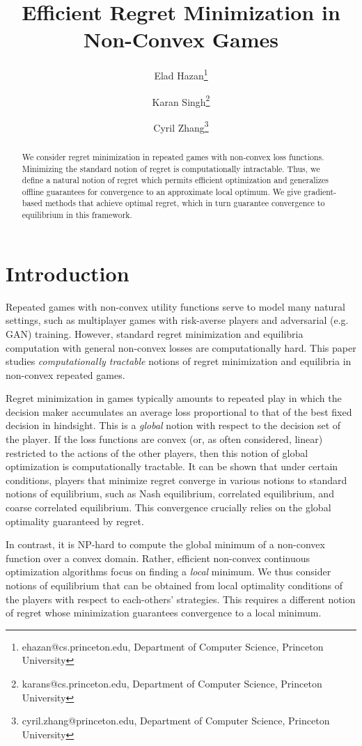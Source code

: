 \documentclass{article}
\title{Efficient Regret Minimization in Non-Convex Games}
\author{Elad Hazan\footnote{ehazan@cs.princeton.edu, Department of Computer Science, Princeton University} \and Karan Singh\footnote{karans@cs.princeton.edu, Department of Computer Science, Princeton University} \and Cyril Zhang\footnote{cyril.zhang@princeton.edu, Department of Computer Science, Princeton University}}
\begin{document}
 

\maketitle

\begin{abstract}
We consider regret minimization in repeated games with non-convex loss functions. Minimizing the standard notion of regret is computationally intractable. Thus, we define a natural notion of regret which permits efficient optimization and generalizes offline guarantees for convergence to an approximate local optimum. We give gradient-based methods that achieve optimal regret, which in turn guarantee convergence to equilibrium in this framework.
\end{abstract}


\section{Introduction}

Repeated games with non-convex utility functions serve to model many natural settings, such as multiplayer games with risk-averse players and adversarial (e.g. GAN) training. However, standard regret minimization and equilibria computation with general non-convex losses are computationally hard. 
This paper studies \emph{computationally tractable} notions of regret minimization and equilibria in non-convex repeated games. 

Regret minimization in games typically amounts to repeated play in which the decision maker accumulates an average loss proportional to that of the best fixed decision in hindsight. This is a {\it global} notion with respect to the decision set of the player. If the loss functions are convex (or, as often considered, linear) restricted to the actions of the other players, then this notion of global optimization is computationally tractable. It can be shown that under certain conditions, players that minimize regret converge in various notions to standard notions of equilibrium, such as Nash equilibrium, correlated equilibrium, and coarse correlated equilibrium. This convergence crucially relies on the global optimality guaranteed by regret.

In contrast, it is NP-hard to compute the global minimum of a non-convex function over a convex domain. Rather, efficient non-convex continuous optimization algorithms focus on finding a {\it local} minimum. We thus consider notions of equilibrium that can be obtained from local optimality conditions of the players with respect to each-others' strategies.  
This requires a different notion of regret whose minimization guarantees convergence to a local minimum.
\end{document}
